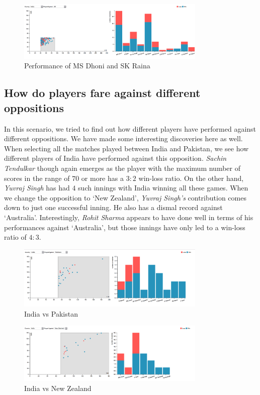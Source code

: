 \documentclass[10pt,journal,compsoc]{IEEEtran}
\begin{document}
\begin{figure}[ht]
\includegraphics[width=9cm]{case4_2.png}
\caption{Performance of MS Dhoni and SK Raina}
\label{fig:case4_2}
\end{figure}


\subsection{How do players fare against different oppositions}
In this scenario, we tried to find out how different players have performed against different oppositions. We have made some interesting discoveries here as well. When selecting all the matches played between India and Pakistan, we see how different players of India have performed against this opposition. \textit{Sachin Tendulkar} though again emerges as the player with the maximum number of scores in the range of $70$ or more has a $3:2$ win-loss ratio. On the other hand, \textit{Yuvraj Singh} has had $4$ such innings with India winning all these games. When we change the opposition to `New Zealand', \textit{Yuvraj Singh's} contribution comes down to just one successful inning. He also has a dismal record against `Australia'. Interestingly, \textit{Rohit Sharma} appears to have done well in terms of his performances against `Australia', but those innings have only led to a win-loss ratio of $4:3$.
\begin{figure}[ht]
\includegraphics[width=9cm]{case5_1.png}
\caption{India vs Pakistan}
\label{fig:case5_1}
\end{figure}

\begin{figure}[ht]
\includegraphics[width=9cm]{casr5_2.png}
\caption{India vs New Zealand}
\label{fig:casr5_2}
\end{figure}
\end{document}
